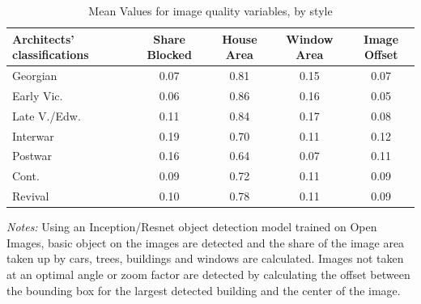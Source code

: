 \documentclass[]{article}
\begin{document}
\newpage
\clearpage

\begin{table}[ht] 
\centering 
 \caption{Mean Values for image quality variables, by style}
 
\label{tab:imgqualsumstats}
\begin{tabular}{lcccc} 
\toprule 
Architects' classifications & Share Blocked & House Area & Window Area & Image Offset \\ 
\midrule
 Georgian & 0.07 & 0.81 & 0.15 & 0.07 \\ 
 Early Vic. & 0.06 & 0.86 & 0.16 & 0.05 \\ 
 Late V./Edw. & 0.11 & 0.84 & 0.17 & 0.08 \\ 
 Interwar & 0.19 & 0.70 & 0.11 & 0.12 \\ 
 Postwar & 0.16 & 0.64 & 0.07 & 0.11 \\ 
 Cont. & 0.09 & 0.72 & 0.11 & 0.09 \\ 
 Revival & 0.10 & 0.78 & 0.11 & 0.09 \\ 
 \bottomrule
\end{tabular}
\begin{minipage}{0.9\textwidth}
\vspace{0.25cm}
\footnotesize \emph{Notes:} Using an Inception/Resnet object detection model trained on Open Images, basic object on the images are detected and the share of the image area taken up by cars, trees, buildings and windows are calculated. Images not taken at an optimal angle or zoom factor are detected by calculating the offset between the bounding box for the largest detected building and the center of the image.
\end{minipage}
\end{table}

\newpage
\clearpage
\end{document}
